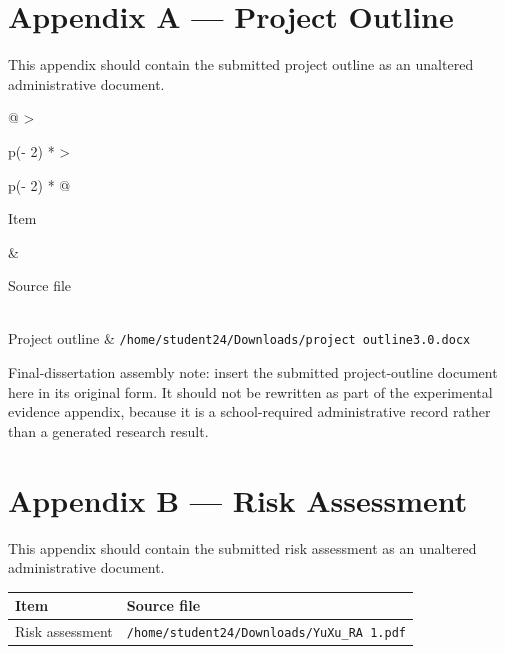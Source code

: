 \providecommand{\tightlist}{%
  \setlength{\itemsep}{0pt}\setlength{\parskip}{0pt}}

\hypertarget{appendix-a-project-outline}{%
\section{Appendix A --- Project Outline}\label{appendix-a-project-outline}}

This appendix should contain the submitted project outline as an unaltered administrative document.

\begin{longtable}[]{@{}
  >{\raggedright\arraybackslash}p{(\columnwidth - 2\tabcolsep) * }
  >{\raggedright\arraybackslash}p{(\columnwidth - 2\tabcolsep) * }@{}}
\toprule\noalign{}
\begin{minipage}[b]{\linewidth}\raggedright
Item
\end{minipage} & \begin{minipage}[b]{\linewidth}\raggedright
Source file
\end{minipage} \\
\midrule\noalign{}
\endhead
\bottomrule\noalign{}
\endlastfoot
Project outline & \texttt{/home/student24/Downloads/project\ outline3.0.docx} \\
\end{longtable}

Final-dissertation assembly note: insert the submitted project-outline document here in its original form. It should not be rewritten as part of the experimental evidence appendix, because it is a school-required administrative record rather than a generated research result.

\hypertarget{appendix-b-risk-assessment}{%
\section{Appendix B --- Risk Assessment}\label{appendix-b-risk-assessment}}

This appendix should contain the submitted risk assessment as an unaltered administrative document.

\begin{longtable}[]{@{}ll@{}}
\toprule\noalign{}
Item & Source file \\
\midrule\noalign{}
\endhead
\bottomrule\noalign{}
\endlastfoot
Risk assessment & \texttt{/home/student24/Downloads/YuXu\_RA\ 1.pdf} \\
\end{longtable}

